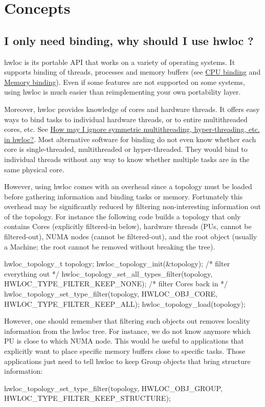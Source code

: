  \hypertarget{a00394_faq1}{}\section{Concepts}\label{a00394_faq1}
\hypertarget{a00394_faq_why}{}\subsection{I only need binding, why should I use hwloc ?}\label{a00394_faq_why}
hwloc is its portable A\+PI that works on a variety of operating systems. It supports binding of threads, processes and memory buffers (see \hyperlink{a00190}{C\+PU binding} and \hyperlink{a00191}{Memory binding}). Even if some features are not supported on some systems, using hwloc is much easier than reimplementing your own portability layer.

Moreover, hwloc provides knowledge of cores and hardware threads. It offers easy ways to bind tasks to individual hardware threads, or to entire multithreaded cores, etc. See \hyperlink{a00394_faq_smt}{How may I ignore symmetric multithreading, hyper-\/threading, etc. in hwloc?}. Most alternative software for binding do not even know whether each core is single-\/threaded, multithreaded or hyper-\/threaded. They would bind to individual threads without any way to know whether multiple tasks are in the same physical core.

However, using hwloc comes with an overhead since a topology must be loaded before gathering information and binding tasks or memory. Fortunately this overhead may be significantly reduced by filtering non-\/interesting information out of the topology. For instance the following code builds a topology that only contains Cores (explicitly filtered-\/in below), hardware threads (P\+Us, cannot be filtered-\/out), N\+U\+MA nodes (cannot be filtered-\/out), and the root object (usually a Machine; the root cannot be removed without breaking the tree).

\begin{DoxyVerb}hwloc_topology_t topology;
hwloc_topology_init(&topology);
/* filter everything out */
hwloc_topology_set_all_types_filter(topology, HWLOC_TYPE_FILTER_KEEP_NONE);
/* filter Cores back in */
hwloc_topology_set_type_filter(topology, HWLOC_OBJ_CORE, HWLOC_TYPE_FILTER_KEEP_ALL);
hwloc_topology_load(topology);
\end{DoxyVerb}


However, one should remember that filtering such objects out removes locality information from the hwloc tree. For instance, we do not know anymore which PU is close to which N\+U\+MA node. This would be useful to applications that explicitly want to place specific memory buffers close to specific tasks. Those applications just need to tell hwloc to keep Group objects that bring structure information\+: \begin{DoxyVerb}hwloc_topology_set_type_filter(topology, HWLOC_OBJ_GROUP, HWLOC_TYPE_FILTER_KEEP_STRUCTURE);
\end{DoxyVerb}


